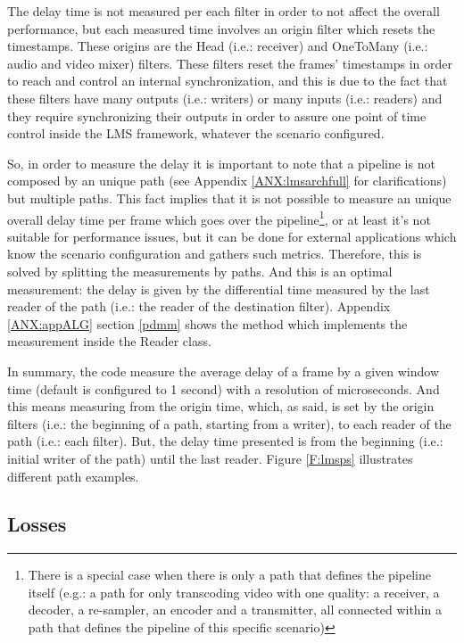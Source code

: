 The delay time is not measured per each filter in order to not affect the overall performance, but each measured time involves an origin filter which resets the timestamps. These origins are the Head (i.e.: receiver) and OneToMany (i.e.: audio and video mixer) filters. These filters reset the frames' timestamps in order to reach and control an internal synchronization, and this is due to the fact that these filters have many outputs (i.e.: writers) or many inputs (i.e.: readers) and they require synchronizing their outputs in order to assure one point of time control inside the LMS framework, whatever the scenario configured.

So, in order to measure the delay it is important to note that a pipeline is not composed by an unique path (see Appendix \ref{ANX:lmsarchfull} for clarifications) but multiple paths. This fact implies that it is not possible to measure an unique overall delay time per frame which goes over the pipeline\footnote{There is a special case when there is only a path that defines the pipeline itself (e.g.: a path for only transcoding video with one quality: a receiver, a decoder, a re-sampler, an encoder and a transmitter, all connected within a path that defines the pipeline of this specific scenario)}, or at least it's not suitable for performance issues, but it can be done for external applications which know the scenario configuration and gathers such metrics. Therefore, this is solved by splitting the measurements by paths. And this is an optimal measurement: the delay is given by the differential time measured by the last reader of the path (i.e.: the reader of the destination filter). Appendix \ref{ANX:appALG} section \ref{pdmm} shows the method which implements the measurement inside the Reader class.

In summary, the code measure the average delay of a frame by a given window time (default is configured to 1 second) with a resolution of microseconds. And this means measuring from the origin time, which, as said, is set by the origin filters (i.e.: the beginning of a path, starting from a writer), to each reader of the path (i.e.: each filter). But, the delay time presented is from the beginning (i.e.: initial writer of the path) until the last reader. Figure \ref{F:lmsps} illustrates different path examples.

\subsection{Losses}

